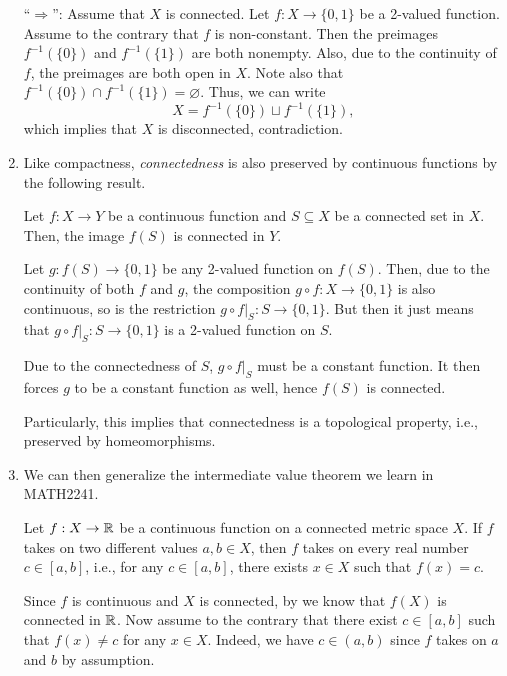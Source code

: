 \begin{enumerate}
\begin{pf}
``\(\Rightarrow\)'': Assume that \(X\) is connected.  Let \(f:X\to\{0,1\}\) be
a 2-valued function. Assume to the contrary that \(f\) is non-constant. Then
the preimages \(f^{-1}(\{0\})\) and \(f^{-1}(\{1\})\) are both nonempty. Also,
due to the continuity of \(f\), the preimages are both open in \(X\). Note also
that \(f^{-1}(\{0\})\cap f^{-1}(\{1\})=\varnothing\). Thus, we can write
\[
X=f^{-1}(\{0\})\sqcup f^{-1}(\{1\}),
\]
which implies that \(X\) is disconnected, contradiction.
\end{pf}

\item Like compactness, \emph{connectedness} is also preserved by continuous
functions by the following result.

\begin{proposition}
\label{prp:cts-preserv-conn}
Let \(f:X\to Y\) be a continuous function and \(S\subseteq X\) be a connected
set in \(X\). Then, the image \(f(S)\) is connected in \(Y\).
\end{proposition}
\begin{pf}
Let \(g:f(S)\to\{0,1\}\) be any 2-valued function on \(f(S)\). Then, due to the
continuity of both \(f\) and \(g\), the composition \(g\circ f:X\to \{0,1\}\)
is also continuous, so is the restriction \(g\circ f|_{S}:S\to\{0,1\}\). But
then it just means that \(g\circ f|_{S}:S\to\{0,1\}\) is a 2-valued function on
\(S\).

Due to the connectedness of \(S\), \(g\circ f|_{S}\) must be a constant
function. It then forces \(g\) to be a constant function as well, hence
\(f(S)\) is connected.
\end{pf}

Particularly, this implies that connectedness is a topological property, i.e.,
preserved by homeomorphisms.

\item We can then generalize the intermediate value theorem we learn in MATH2241.
\begin{theorem}
\label{thm:ivt-conn}
Let \(f:X\to\mathbb{R}\) be a continuous function on a connected metric space \(X\). If
\(f\) takes on two different values \(a,b\in X\), then \(f\) takes on every
real number \(c\in[a,b]\), i.e., for any \(c\in[a,b]\), there exists \(x\in X\)
such that \(f(x)=c\).
\end{theorem}
\begin{pf}
Since \(f\) is continuous and \(X\) is connected, by
 we know that \(f(X)\) is connected in \(\mathbb{R}\).
Now assume to the contrary that there exist \(c\in [a,b]\) such that
\(f(x)\ne c\) for any \(x\in X\). Indeed, we have \(c\in (a,b)\) since \(f\)
takes on \(a\) and \(b\) by assumption.


\end{pf}
\end{enumerate}
